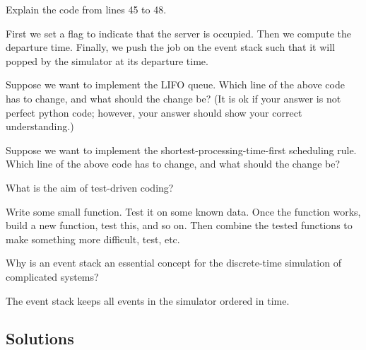 \begin{exercise}[201907]
 Explain the code from lines 45 to 48.

\begin{solution}
 First we set a flag to indicate that the server is occupied.
 Then we compute the departure time.
 Finally, we push the job on the event stack such that it will popped by the simulator at its departure time.
\end{solution}
\end{exercise} 

\begin{exercise}[201907] 
Suppose we want to implement the LIFO queue. Which line of the above code has to change, and what should the change be? (It is ok if your answer is not perfect python code; however, your answer should show your correct understanding.) 

\begin{solution}
\end{solution}

\end{exercise} 

\begin{exercise}[201907] 
 Suppose we want to implement the shortest-processing-time-first scheduling rule.
 Which line of the above code has to change, and what should the change be?

\begin{solution}
\end{solution}
\end{exercise} 


\begin{exercise}[201907]
What is the aim of test-driven coding? 

\begin{solution}
 Write some small function.
 Test it on some known data.
 Once the function works, build a new function, test this, and so on.
 Then combine the tested functions to make something more difficult, test, etc.
\end{solution}
\end{exercise}

\begin{exercise}[201907]
 Why is an event stack an essential concept for the discrete-time simulation of complicated systems?

\begin{solution}
 The event stack keeps all events in the simulator ordered in time.
\end{solution} 
\end{exercise}

\subsection*{Solutions}




